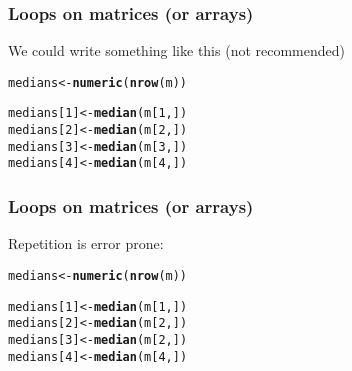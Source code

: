 \documentclass[12pt]{beamer}\usepackage[]{graphicx}\usepackage[]{color}
\makeatletter
\newcommand{\hlnum}[1]{\textcolor[rgb]{0.686,0.059,0.569}{#1}}%
\newcommand{\hlstd}[1]{\textcolor[rgb]{0.345,0.345,0.345}{#1}}%
\newcommand{\hlkwb}[1]{\textcolor[rgb]{0.69,0.353,0.396}{#1}}%
\newcommand{\hlkwd}[1]{\textcolor[rgb]{0.737,0.353,0.396}{\textbf{#1}}}%
\newenvironment{kframe}{%
 \def\at@end@of@kframe{}%
 \ifinner\ifhmode%
  \def\at@end@of@kframe{\end{minipage}}%
  \begin{minipage}{\columnwidth}%
 \fi\fi%
 \def\FrameCommand##1{\hskip\@totalleftmargin \hskip-\fboxsep
 \colorbox{shadecolor}{##1}\hskip-\fboxsep
     \hskip-\linewidth \hskip-\@totalleftmargin \hskip\columnwidth}%
 \MakeFramed {\advance\hsize-\width
   \@totalleftmargin\z@ \linewidth\hsize
   \@setminipage}}%
 {\par\unskip\endMakeFramed%
 \at@end@of@kframe}
\newenvironment{knitrout}{}{} %
\makeatother
\begin{document}

\begin{frame}[fragile]
\frametitle{Loops on matrices (or arrays)}

We could write something like this (not recommended)
\begin{knitrout}\footnotesize
{}\color{fgcolor}\begin{kframe}
\begin{alltt}
\hlstd{medians} \hlkwb{<-} \hlkwd{numeric}\hlstd{(}\hlkwd{nrow}\hlstd{(m))}

\hlstd{medians[}\hlnum{1}\hlstd{]} \hlkwb{<-} \hlkwd{median}\hlstd{(m[}\hlnum{1}\hlstd{, ])}
\hlstd{medians[}\hlnum{2}\hlstd{]} \hlkwb{<-} \hlkwd{median}\hlstd{(m[}\hlnum{2}\hlstd{, ])}
\hlstd{medians[}\hlnum{3}\hlstd{]} \hlkwb{<-} \hlkwd{median}\hlstd{(m[}\hlnum{3}\hlstd{, ])}
\hlstd{medians[}\hlnum{4}\hlstd{]} \hlkwb{<-} \hlkwd{median}\hlstd{(m[}\hlnum{4}\hlstd{, ])}
\end{alltt}
\end{kframe}
\end{knitrout}

\end{frame}


\begin{frame}[fragile]
\frametitle{Loops on matrices (or arrays)}

Repetition is error prone:
\begin{knitrout}\footnotesize
{}\color{fgcolor}\begin{kframe}
\begin{alltt}
\hlstd{medians} \hlkwb{<-} \hlkwd{numeric}\hlstd{(}\hlkwd{nrow}\hlstd{(m))}

\hlstd{medians[}\hlnum{1}\hlstd{]} \hlkwb{<-} \hlkwd{median}\hlstd{(m[}\hlnum{1}\hlstd{, ])}
\hlstd{medians[}\hlnum{2}\hlstd{]} \hlkwb{<-} \hlkwd{median}\hlstd{(m[}\hlnum{2}\hlstd{, ])}
\hlstd{medians[}\hlnum{3}\hlstd{]} \hlkwb{<-} \hlkwd{median}\hlstd{(m[}\hlnum{2}\hlstd{, ])}
\hlstd{medians[}\hlnum{4}\hlstd{]} \hlkwb{<-} \hlkwd{median}\hlstd{(m[}\hlnum{4}\hlstd{, ])}
\end{alltt}
\end{kframe}
\end{knitrout}

\end{frame}
\end{document}
